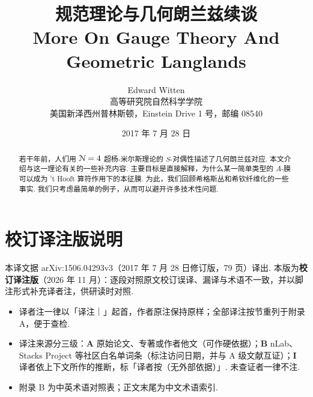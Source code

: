 \documentclass[letterpaper,reqno,11pt]{article}
\title{\LARGE 规范理论与几何朗兰兹续谈\\[1ex]
  {\large More On Gauge Theory And Geometric Langlands}}
\author{Edward Witten\\[1ex]
  {\large 高等研究院自然科学学院}\\
  {\large 美国新泽西州普林斯顿，Einstein Drive 1 号，邮编 08540}}
\date{\large 2017 年 7 月 28 日}
\begin{document}
\maketitle
\begin{abstract}
若干年前，人们用 ${\cal N}=4$ 超杨-米尔斯理论的 $S$-对偶性描述了几何朗兰兹对应. 本文介绍与这一理论有关的一些补充内容. 主要目标是直接解释，为什么某一简单类型的 $A$-膜可以成为 't Hooft 算符作用下的本征膜. 为此，我们回顾希格斯丛和希钦纤维化的一些事实. 我们只考虑最简单的例子，从而可以避开许多技术性问题.
\end{abstract}
\papercontents
\section*{校订译注版说明}
本译文据 arXiv:1506.04293v3（2017 年 7 月 28 日修订版，79 页）译出. 本版为\textbf{校订译注版}（2026 年 11 月）：逐段对照原文校订误译、漏译与术语不一致，并以脚注形式补充译者注，供研读时对照.

\begin{itemize}[leftmargin=2em,itemsep=0.15ex,topsep=0.3ex]
\item 译者注一律以「译注｜」起首，作者原注保持原样；全部译注按节重列于附录 A，便于查检.
\item 译注来源分三级：\textbf{A} 原始论文、专著或作者他文（可作硬依据）；\textbf{B} nLab、Stacks Project 等社区白名单词条（标注访问日期，并与 A 级文献互证）；\textbf{I} 译者依上下文所作的推断，标「译者按（无外部依据）」. 未查证者一律不注.
\item 附录 B 为中英术语对照表；正文末尾为中文术语索引.
\end{itemize}




\par
{}

\appendix


\printindex
\end{document}
